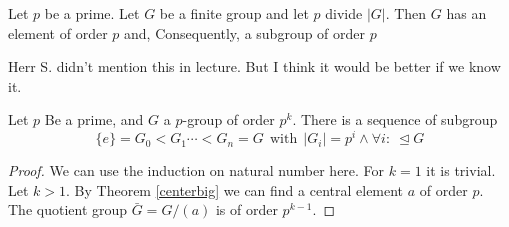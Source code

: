 \begin{theorem}
    Let \(p\) be a prime. Let \(G\) be a finite group and let \(p\) divide \(|G|\). Then \(G\) has an element of order \(p\) and, Consequently, a subgroup of order \(p\)    
\end{theorem}
\begin{remark}
    Herr S. didn't mention this in lecture. But I think it would be better if we know it.
\end{remark}

\begin{theorem}
     Let \(p\) Be a prime, and \(G\) a \(p\)-group of order \(p^k\). There is a sequence of subgroup\[\{e\}=G_0<G_1\cdots <G_n =  G\ \ \text{with}\ \ |G_i|=p^i \wedge \forall i:\ \trianglelefteq G \]
\end{theorem}
\begin{proof}
    We can use the induction on natural number here. For \(k = 1\) it is trivial. Let \(k>1\). By Theorem \ref{centerbig} we can find a central element \(a\) of order \(p\). The quotient group \(\bar{G} = G / (a)\) is of order \(p^{k-1}\).
\end{proof}